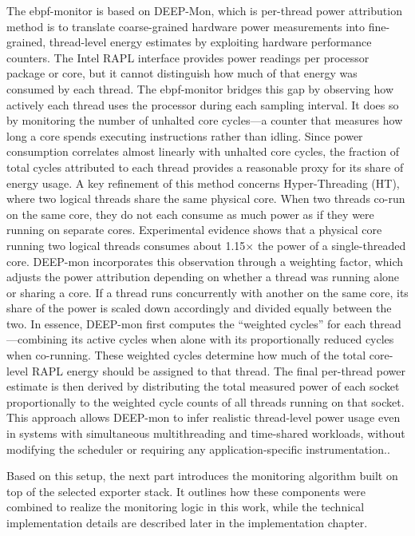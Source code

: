 The ebpf-monitor is based on DEEP-Mon, which is per-thread power attribution method is to translate coarse-grained hardware power measurements into fine-grained, thread-level energy estimates by exploiting hardware performance counters. The Intel RAPL interface provides power readings per processor package or core, but it cannot distinguish how much of that energy was consumed by each thread. The ebpf-monitor bridges this gap by observing how actively each thread uses the processor during each sampling interval. It does so by monitoring the number of unhalted core cycles—a counter that measures how long a core spends executing instructions rather than idling. Since power consumption correlates almost linearly with unhalted core cycles, the fraction of total cycles attributed to each thread provides a reasonable proxy for its share of energy usage.
A key refinement of this method concerns Hyper-Threading (HT), where two logical threads share the same physical core. When two threads co-run on the same core, they do not each consume as much power as if they were running on separate cores. Experimental evidence shows that a physical core running two logical threads consumes about 1.15× the power of a single-threaded core. DEEP-mon incorporates this observation through a weighting factor, which adjusts the power attribution depending on whether a thread was running alone or sharing a core. If a thread runs concurrently with another on the same core, its share of the power is scaled down accordingly and divided equally between the two.
In essence, DEEP-mon first computes the “weighted cycles” for each thread—combining its active cycles when alone with its proportionally reduced cycles when co-running. These weighted cycles determine how much of the total core-level RAPL energy should be assigned to that thread. The final per-thread power estimate is then derived by distributing the total measured power of each socket proportionally to the weighted cycle counts of all threads running on that socket. This approach allows DEEP-mon to infer realistic thread-level power usage even in systems with simultaneous multithreading and time-shared workloads, without modifying the scheduler or requiring any application-specific instrumentation.\cite{8425477}.

Based on this setup, the next part introduces the monitoring algorithm built on top of the selected exporter stack. It outlines how these components were combined to realize the monitoring logic in this work, while the technical implementation details are described later in the implementation chapter.

